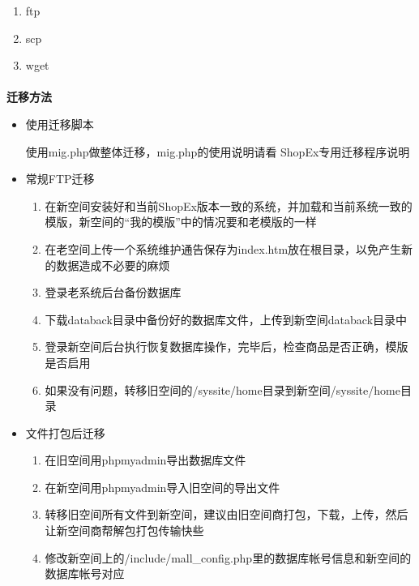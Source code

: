 \documentclass{article}
\begin{document}
\begin{enumerate}
\item ftp
\item scp
\item wget
\end{enumerate}

\paragraph{}\textbf{迁移方法}\\

\begin{itemize}
\item 使用迁移脚本

使用mig.php做整体迁移，mig.php的使用说明请看 ShopEx专用迁移程序说明
\end{itemize}

\begin{itemize}
\item 常规FTP迁移

 \begin{enumerate}
 \item 在新空间安装好和当前ShopEx版本一致的系统，并加载和当前系统一致的模版，新空间的“我的模版”中的情况要和老模版的一样
 \item 在老空间上传一个系统维护通告保存为index.htm放在根目录，以免产生新的数据造成不必要的麻烦
 \item 登录老系统后台备份数据库
 \item 下载databack目录中备份好的数据库文件，上传到新空间databack目录中
 \item 登录新空间后台执行恢复数据库操作，完毕后，检查商品是否正确，模版是否启用
 \item 如果没有问题，转移旧空间的/syssite/home目录到新空间/syssite/home目录
 \end{enumerate}
\end{itemize}

\begin{itemize}
\item 文件打包后迁移

 \begin{enumerate}
 \item 在旧空间用phpmyadmin导出数据库文件
 \item 在新空间用phpmyadmin导入旧空间的导出文件
 \item 转移旧空间所有文件到新空间，建议由旧空间商打包，下载，上传，然后让新空间商帮解包打包传输快些
 \item 修改新空间上的/include/mall\_config.php里的数据库帐号信息和新空间的数据库帐号对应
 \end{enumerate}
\end{itemize}
\end{document}
